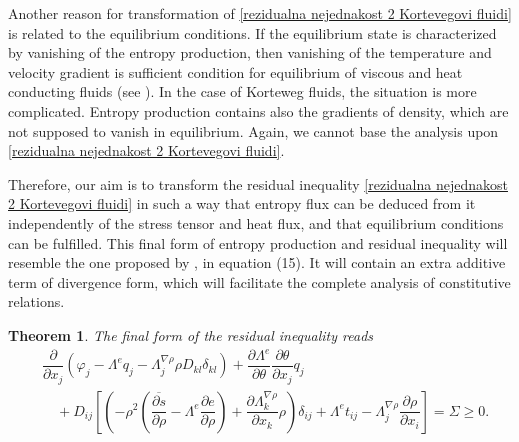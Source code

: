 \documentclass[a4paper,fleqn]{cas-sc}
\newtheorem{theorem}{Theorem}[section]
\theoremstyle{definition}
\begin{document}
Another reason for transformation of \eqref{rezidualna nejednakost 2 Kortevegovi fluidi} is related to the equilibrium conditions. If the equilibrium state is characterized by vanishing of the entropy production, then vanishing of the temperature and velocity gradient is sufficient condition for equilibrium of viscous and heat conducting fluids (see \cite{liu2002continuum}). In the case of Korteweg fluids, the situation is more complicated. Entropy production contains also the gradients of density, which are not supposed to vanish in equilibrium. Again, we cannot base the analysis upon \eqref{rezidualna nejednakost 2 Kortevegovi fluidi}. 

Therefore, our aim is to transform the residual inequality \eqref{rezidualna nejednakost 2 Kortevegovi fluidi} in such a way that entropy flux can be deduced from it independently of the stress tensor and heat flux, and that equilibrium conditions can be fulfilled. This final form of entropy production and residual inequality will resemble the one proposed by \cite{anderson1998diffuse}, in equation (15). It will contain an extra additive term of divergence form, which will facilitate the complete analysis of constitutive relations. 

\begin{theorem}
	The final form of the residual inequality reads 
	\begin{align} \label{rezidualna nejednakost final Kortevegovi fluidi}
		& \dfrac{\partial}{\partial x_j} \left( \varphi_j - \Lambda^eq_j 
		- \Lambda^{\nabla\rho}_j \rho D_{kl}\delta_{kl}\right) 
		+ \dfrac{\partial\Lambda^e}{\partial\theta} \dfrac{\partial\theta}{\partial x_j}q_j 
		\\
		& \quad + D_{ij} \left[ \left( -\rho^2 \left( \overline{\dfrac{\partial s}{\partial\rho}} 
		- \Lambda^e \dfrac{\partial e}{\partial\rho} \right) 
		+ \dfrac{\partial\Lambda^{\nabla\rho}_k}{\partial x_k}\rho\right) \delta_{ij} 
		+ \Lambda^et_{ij} - \Lambda^{\nabla\rho}_j\dfrac{\partial\rho}{\partial x_i} \right]
		= \Sigma \geq 0. 
		\nonumber 
	\end{align}
\end{theorem}
\end{document}
